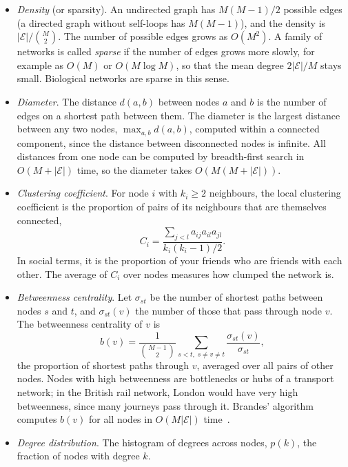 \begin{itemize}
  \item \emph{Density} (or sparsity). An undirected graph has $M(M-1)/2$ possible edges (a directed graph without self-loops has $M(M-1)$), and the density is $|\mathcal{E}|/\binom{M}{2}$. The number of possible edges grows as $O(M^2)$. A family of networks is called \emph{sparse} if the number of edges grows more slowly, for example as $O(M)$ or $O(M\log M)$, so that the mean degree $2|\mathcal{E}|/M$ stays small. Biological networks are sparse in this sense.
  \item \emph{Diameter}. The distance $d(a,b)$ between nodes $a$ and $b$ is the number of edges on a shortest path between them. The diameter is the largest distance between any two nodes, $\max_{a,b}d(a,b)$, computed within a connected component, since the distance between disconnected nodes is infinite. All distances from one node can be computed by breadth-first search in $O(M+|\mathcal{E}|)$ time, so the diameter takes $O(M(M+|\mathcal{E}|))$.
  \item \emph{Clustering coefficient}. For node $i$ with $k_i\ge2$ neighbours, the local clustering coefficient is the proportion of pairs of its neighbours that are themselves connected,
  \begin{equation}
    C_i = \frac{\sum_{j<l}a_{ij}a_{il}a_{jl}}{k_i(k_i-1)/2}.
  \end{equation}
  In social terms, it is the proportion of your friends who are friends with each other. The average of $C_i$ over nodes measures how clumped the network is.
  \item \emph{Betweenness centrality}. Let $\sigma_{st}$ be the number of shortest paths between nodes $s$ and $t$, and $\sigma_{st}(v)$ the number of those that pass through node $v$. The betweenness centrality of $v$ is
  \begin{equation}
    b(v) = \frac{1}{\binom{M-1}{2}}\sum_{s<t,\; s\neq v\neq t}\frac{\sigma_{st}(v)}{\sigma_{st}},
  \end{equation}
  the proportion of shortest paths through $v$, averaged over all pairs of other nodes. Nodes with high betweenness are bottlenecks or hubs of a transport network; in the British rail network, London would have very high betweenness, since many journeys pass through it. Brandes' algorithm computes $b(v)$ for all nodes in $O(M|\mathcal{E}|)$ time~\citep{brandes2001}.
  \item \emph{Degree distribution}. The histogram of degrees across nodes, $p(k)$, the fraction of nodes with degree $k$.
\end{itemize}

